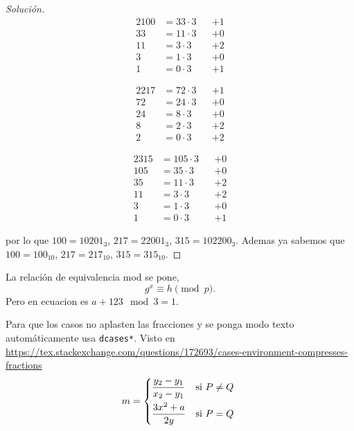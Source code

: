 \documentclass[spanish,mexico]{article}
\numberwithin{equation}{section}
\theoremstyle{definition}
\theoremstyle{remark}
\newenvironment{solution}{\begin{proof}[Solución]}{\end{proof}}
\begin{document}
\begin{enumerate}[wide]
\begin{solution}
    \begin{minipage}{.3\linewidth}
      \begin{alignat*}{2}
        100 &=33\cdot3&&+1\\
        33  &=11\cdot3&&+0\\
        11  &=3 \cdot3&&+2\\
        3   &=1 \cdot3&&+0\\
        1   &=0 \cdot3&&+1
      \end{alignat*}
    \end{minipage}
    \begin{minipage}{.3\linewidth}
      \begin{alignat*}{2}
        217 &=72 \cdot3&&+1\\
        72  &=24 \cdot3&&+0\\
        24  &=8  \cdot3&&+0\\
        8   &=2  \cdot3&&+2\\
        2   &=0  \cdot3&&+2
      \end{alignat*}
    \end{minipage}
    \begin{minipage}{.3\linewidth}
      \begin{alignat*}{2}
        315 &=105 \cdot3&&+0\\
        105 &=35  \cdot3&&+0\\
        35  &=11  \cdot3&&+2\\
        11  &=3   \cdot3&&+2\\
        3   &=1   \cdot3&&+0\\
        1   &=0   \cdot3&&+1
      \end{alignat*}
    \end{minipage}
    
    por lo que $100=10201_3$, $217=22001_3$, $315=102200_3$. Ademas ya sabemos que $100=100_{10}$, $217=217_{10}$, $315=315_{10}$.
\end{solution}

\end{enumerate}
La relación de equivalencia mod se pone,
\[
    g^x
    \equiv h
    \pmod{p}.
\]
Pero en ecuacion es $a+123\mod 3=1$.

Para que los casos no aplasten las fracciones y se ponga modo texto automáticamente usa \texttt{dcases*}. Visto en \url{https://tex.stackexchange.com/questions/172693/cases-environment-compresses-fractions} 
\[
    m=
    \begin{dcases*}
        \frac{y_2-y_1}{x_2-y_1} &si $P\neq Q$\\
        \frac{3x^2+a}{2y}       &si $P=Q$
    \end{dcases*}
\]
\end{document}
